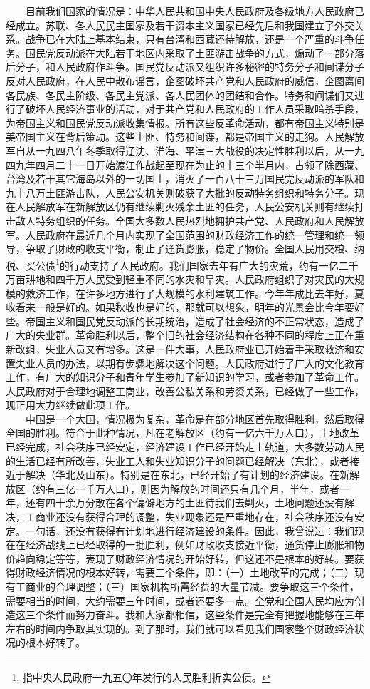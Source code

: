 \documentclass[cn,11pt,chinese]{elegantbook}
\begin{document}
　　目前我们国家的情况是：中华人民共和国中央人民政府及各级地方人民政府已经成立。苏联、各人民民主国家及若干资本主义国家已经先后和我国建立了外交关系。战争已在大陆上基本结束，只有台湾和西藏还待解放，还是一个严重的斗争任务。国民党反动派在大陆若干地区内采取了土匪游击战争的方式，煽动了一部分落后分子，和人民政府作斗争。国民党反动派又组织许多秘密的特务分子和间谍分子反对人民政府，在人民中散布谣言，企图破坏共产党和人民政府的威信，企图离间各民族、各民主阶级、各民主党派、各人民团体的团结和合作。特务和间谍们又进行了破坏人民经济事业的活动，对于共产党和人民政府的工作人员采取暗杀手段，为帝国主义和国民党反动派收集情报。所有这些反革命活动，都有帝国主义特别是美帝国主义在背后策动。这些土匪、特务和间谍，都是帝国主义的走狗。人民解放军自从一九四八年冬季取得辽沈、淮海、平津三大战役的决定性胜利以后，从一九四九年四月二十一日开始渡江作战起至现在为止的十三个半月内，占领了除西藏、台湾及若干其它海岛以外的一切国土，消灭了一百八十三万国民党反动派的军队和九十八万土匪游击队，人民公安机关则破获了大批的反动特务组织和特务分子。现在人民解放军在新解放区仍有继续剿灭残余土匪的任务，人民公安机关则有继续打击敌人特务组织的任务。全国大多数人民热烈地拥护共产党、人民政府和人民解放军。人民政府在最近几个月内实现了全国范围的财政经济工作的统一管理和统一领导，争取了财政的收支平衡，制止了通货膨胀，稳定了物价。全国人民用交粮、纳税、买公债\footnote[2]{指中央人民政府一九五〇年发行的人民胜利折实公债。}的行动支持了人民政府。我们国家去年有广大的灾荒，约有一亿二千万亩耕地和四千万人民受到轻重不同的水灾和旱灾。人民政府组织了对灾民的大规模的救济工作，在许多地方进行了大规模的水利建筑工作。今年年成比去年好，夏收看来一般是好的。如果秋收也是好的，那就可以想象，明年的光景会比今年要好些。帝国主义和国民党反动派的长期统治，造成了社会经济的不正常状态，造成了广大的失业群。革命胜利以后，整个旧的社会经济结构在各种不同的程度上正在重新改组，失业人员又有增多。这是一件大事，人民政府业已开始着手采取救济和安置失业人员的办法，以期有步骤地解决这个问题。人民政府进行了广大的文化教育工作，有广大的知识分子和青年学生参加了新知识的学习，或者参加了革命工作。人民政府对于合理地调整工商业，改善公私关系和劳资关系，已经做了一些工作，现正用大力继续做此项工作。\\
　　中国是一个大国，情况极为复杂，革命是在部分地区首先取得胜利，然后取得全国的胜利。符合于此种情况，凡在老解放区（约有一亿六千万人口），土地改革已经完成，社会秩序已经安定，经济建设工作已经开始走上轨道，大多数劳动人民的生活已经有所改善，失业工人和失业知识分子的问题已经解决（东北），或者接近于解决（华北及山东）。特别是在东北，已经开始了有计划的经济建设。在新解放区（约有三亿一千万人口），则因为解放的时间还只有几个月，半年，或者一年，还有四十余万分散在各个偏僻地方的土匪待我们去剿灭，土地问题还没有解决，工商业还没有获得合理的调整，失业现象还是严重地存在，社会秩序还没有安定。一句话，还没有获得有计划地进行经济建设的条件。因此，我曾说过：我们现在在经济战线上已经取得的一批胜利，例如财政收支接近平衡，通货停止膨胀和物价趋向稳定等等，表现了财政经济情况的开始好转，但这还不是根本的好转。要获得财政经济情况的根本好转，需要三个条件，即：（一）土地改革的完成；（二）现有工商业的合理调整；（三）国家机构所需经费的大量节减。要争取这三个条件，需要相当的时间，大约需要三年时间，或者还要多一点。全党和全国人民均应为创造这三个条件而努力奋斗。我和大家都相信，这些条件是完全有把握地能够在三年左右的时间内争取其实现的。到了那时，我们就可以看见我们国家整个财政经济状况的根本好转了。\\
\end{document}
